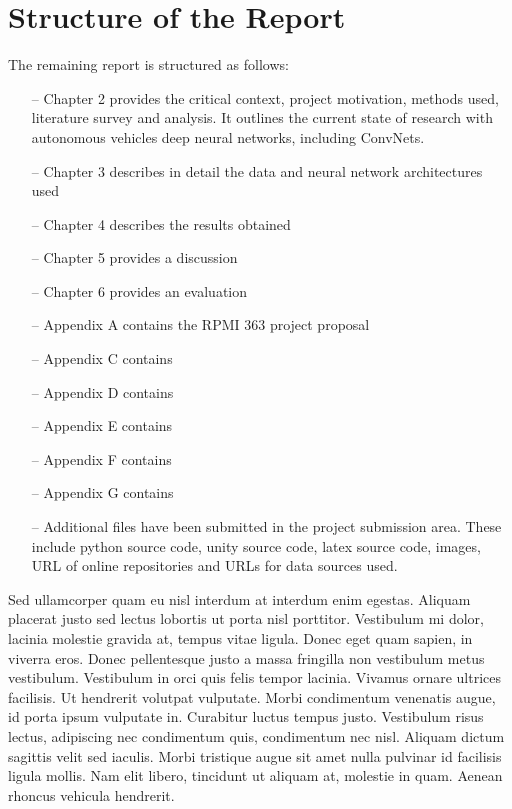 
\section{Structure of the Report}

The remaining report is structured as follows:
\begin{itemize}
    \item[--] Chapter 2 provides the critical context, project motivation, methods used, literature survey and analysis. It outlines the current state of research with autonomous vehicles deep neural networks, including ConvNets.
    \item[--] Chapter 3 describes in detail the data and neural network architectures used
    \item[--] Chapter 4 describes the results obtained
    \item[--] Chapter 5 provides a discussion
    \item[--] Chapter 6 provides an evaluation
    \item[--] Appendix A contains the RPMI 363 project proposal
    \item[--] Appendix C contains
    \item[--] Appendix D contains
    \item[--] Appendix E contains
    \item[--] Appendix F contains
    \item[--] Appendix G contains
    \item[--] Additional files have been submitted in the project submission area. These include python source code, unity source code, latex source code, images, URL of online repositories and URLs for data sources used.
\end{itemize}
Sed ullamcorper quam eu nisl interdum at interdum enim egestas. Aliquam placerat justo sed lectus lobortis ut porta nisl porttitor. Vestibulum mi dolor, lacinia molestie gravida at, tempus vitae ligula. Donec eget quam sapien, in viverra eros. Donec pellentesque justo a massa fringilla non vestibulum metus vestibulum. Vestibulum in orci quis felis tempor lacinia. Vivamus ornare ultrices facilisis. Ut hendrerit volutpat vulputate. Morbi condimentum venenatis augue, id porta ipsum vulputate in. Curabitur luctus tempus justo. Vestibulum risus lectus, adipiscing nec condimentum quis, condimentum nec nisl. Aliquam dictum sagittis velit sed iaculis. Morbi tristique augue sit amet nulla pulvinar id facilisis ligula mollis. Nam elit libero, tincidunt ut aliquam at, molestie in quam. Aenean rhoncus vehicula hendrerit.